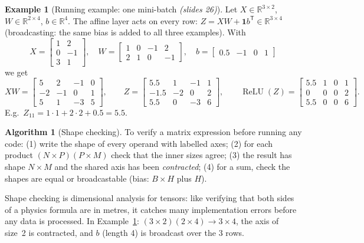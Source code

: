\documentclass[11pt,a4paper]{article}
\newcommand{\R}{\mathbb{R}}
\newcommand{\T}{^{\mathsf{T}}}
\newcommand{\ReLU}{\operatorname{ReLU}}
\newcommand{\slides}[1]{\texorpdfstring{\emph{(slides #1)}}{(slides #1)}}
\theoremstyle{definition}
\newtheorem{example}[definition]{Example}
\newtheorem{algorithm}[definition]{Algorithm}
\theoremstyle{plain}
\begin{document}
\begin{example}[Running example: one mini-batch \slides{26}]\label{ex:running}
Let $X\in\R^{3\times2}$, $W\in\R^{2\times4}$, $b\in\R^{4}$. The affine layer acts on every row: $Z=XW+\mathbf 1b\T\in\R^{3\times4}$ (broadcasting: the same bias is added to all three examples). With
\[
X=\begin{bmatrix}1&2\\0&-1\\3&1\end{bmatrix},\quad
W=\begin{bmatrix}1&0&-1&2\\2&1&0&-1\end{bmatrix},\quad
b=\begin{bmatrix}0.5&-1&0&1\end{bmatrix}
\]
we get
\[
XW=\begin{bmatrix}5&2&-1&0\\-2&-1&0&1\\5&1&-3&5\end{bmatrix},\qquad
Z=\begin{bmatrix}5.5&1&-1&1\\-1.5&-2&0&2\\5.5&0&-3&6\end{bmatrix},\qquad
\ReLU(Z)=\begin{bmatrix}5.5&1&0&1\\0&0&0&2\\5.5&0&0&6\end{bmatrix}.
\]
E.g.\ $Z_{11}=1\cdot1+2\cdot2+0.5=5.5$.
\end{example}

\begin{algorithm}[Shape checking]\label{alg:shape}
To verify a matrix expression before running any code: (1) write the shape of every operand with labelled axes; (2) for each product $(N\times P)(P\times M)$ check that the inner sizes agree; (3) the result has shape $N\times M$ and the shared axis has been \emph{contracted}; (4) for a sum, check the shapes are equal or broadcastable (bias: $B\times H$ plus $H$).
\end{algorithm}

\begin{intuition}
Shape checking is dimensional analysis for tensors: like verifying that both sides of a physics formula are in metres, it catches many implementation errors before any data is processed. In Example~\ref{ex:running}: $(3\times2)(2\times4)\to3\times4$, the axis of size~2 is contracted, and $b$ (length 4) is broadcast over the 3 rows.
\end{intuition}
\end{document}
